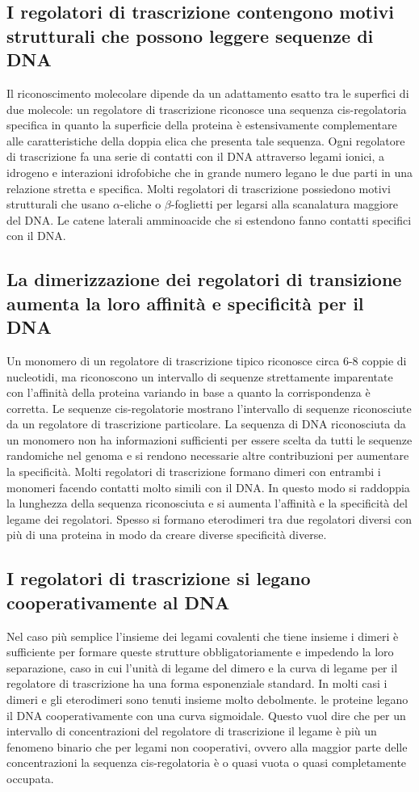 \subsection{I regolatori di trascrizione contengono motivi strutturali che possono leggere sequenze di DNA}
Il riconoscimento molecolare dipende da un adattamento esatto tra le superfici di due molecole: un regolatore di trascrizione riconosce una sequenza cis-regolatoria specifica in quanto 
la superficie della proteina \`e estensivamente complementare alle caratteristiche della doppia elica che presenta tale sequenza. Ogni regolatore di trascrizione fa una serie di contatti
con il DNA attraverso legami ionici, a idrogeno e interazioni idrofobiche che in grande numero legano le due parti in una relazione stretta e specifica. Molti regolatori di trascrizione
possiedono motivi strutturali che usano $\alpha$-eliche o $\beta$-foglietti per legarsi alla scanalatura maggiore del DNA. Le catene laterali amminoacide che si estendono fanno contatti
specifici con il DNA.
\subsection{La dimerizzazione dei regolatori di transizione aumenta la loro affinit\`a e specificit\`a per il DNA}
Un monomero di un regolatore di trascrizione tipico riconosce circa $6$-$8$ coppie di nucleotidi, ma riconoscono un intervallo di sequenze strettamente imparentate con l'affinit\`a della
proteina variando in base a quanto la corrispondenza \`e corretta. Le sequenze cis-regolatorie mostrano l'intervallo di sequenze riconosciute da un regolatore di trascrizione 
particolare. La sequenza di DNA riconosciuta da un monomero non ha informazioni sufficienti per essere scelta da tutti le sequenze randomiche nel genoma e si rendono necessarie altre
contribuzioni per aumentare la specificit\`a. Molti regolatori di trascrizione formano dimeri con entrambi i monomeri facendo contatti molto simili con il DNA. In questo modo si 
raddoppia la lunghezza della sequenza riconosciuta e si aumenta l'affinit\`a e la specificit\`a del legame dei regolatori. Spesso si formano eterodimeri tra due regolatori diversi con 
pi\`u di una proteina in modo da creare diverse specificit\`a diverse.
\subsection{I regolatori di trascrizione si legano cooperativamente al DNA}
Nel caso pi\`u semplice l'insieme dei legami covalenti che tiene insieme i dimeri \`e sufficiente per formare queste strutture obbligatoriamente e impedendo la loro separazione, caso in
cui l'unit\`a di legame del dimero e la curva di legame per il regolatore di trascrizione ha una forma esponenziale standard. In molti casi i dimeri e gli eterodimeri sono tenuti
insieme molto debolmente. le proteine legano il DNA cooperativamente con una curva sigmoidale. Questo vuol dire che per un intervallo di concentrazioni del regolatore di trascrizione
il legame \`e pi\`u un fenomeno binario che per legami non cooperativi, ovvero alla maggior parte delle concentrazioni la sequenza cis-regolatoria \`e o quasi vuota o quasi completamente
occupata.
